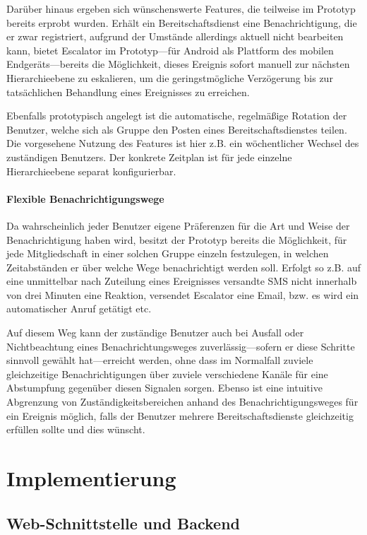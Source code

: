 \documentclass[11pt,utf8,notoc,bibnum,german,final]{zihpub}
\begin{document}
Darüber hinaus ergeben sich wünschenswerte Features, die teilweise im Prototyp
bereits erprobt wurden. Erhält ein Bereitschaftsdienst eine Benachrichtigung,
die er zwar registriert, aufgrund der Umstände allerdings aktuell nicht
bearbeiten kann, bietet Escalator im Prototyp—für Android als Plattform des
mobilen Endgeräts—bereits die Möglichkeit, dieses Ereignis sofort manuell zur
nächsten Hierarchieebene zu eskalieren, um die geringstmögliche Verzögerung bis
zur tatsächlichen Behandlung eines Ereignisses zu erreichen.

Ebenfalls prototypisch angelegt ist die automatische, regelmäßige Rotation der
Benutzer, welche sich als Gruppe den Posten eines Bereitschaftsdienstes teilen.
Die vorgesehene Nutzung des Features ist hier z.B. ein wöchentlicher Wechsel
des zuständigen Benutzers. Der konkrete Zeitplan ist für jede einzelne
Hierarchieebene separat konfigurierbar.

\paragraph{Flexible Benachrichtigungswege}

Da wahrscheinlich jeder Benutzer eigene Präferenzen für die Art und Weise der
Benachrichtigung haben wird, besitzt der Prototyp bereits die Möglichkeit, für
jede Mitgliedschaft in einer solchen Gruppe einzeln festzulegen, in welchen
Zeitabständen er über welche Wege benachrichtigt werden soll. Erfolgt so z.B.
auf eine unmittelbar nach Zuteilung eines Ereignisses versandte SMS nicht
innerhalb von drei Minuten eine Reaktion, versendet Escalator eine Email, bzw.
es wird ein automatischer Anruf getätigt etc.

Auf diesem Weg kann der zuständige Benutzer auch bei Ausfall oder
Nichtbeachtung eines Benachrichtungsweges zuverlässig—sofern er diese Schritte
sinnvoll gewählt hat—erreicht werden, ohne dass im Normalfall zuviele
gleichzeitige Benachrichtigungen über zuviele verschiedene Kanäle für eine
Abstumpfung gegenüber diesen Signalen sorgen. Ebenso ist eine intuitive
Abgrenzung von Zuständigkeitsbereichen anhand des Benachrichtigungsweges für
ein Ereignis möglich, falls der Benutzer mehrere Bereitschaftsdienste
gleichzeitig erfüllen sollte und dies wünscht.

\section{Implementierung}

\subsection{Web-Schnittstelle und Backend}
\end{document}
